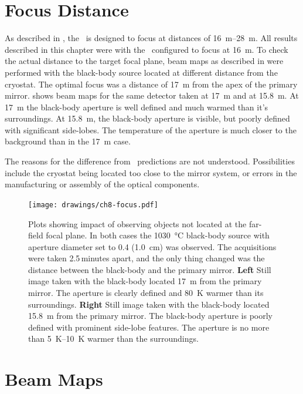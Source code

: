 \section{Focus Distance}\label{sec:ch8-focus-distance}

As described in , the \Imager\ is designed to focus at distances of \SIrange{16}{28}{\m}.
All results described in this chapter were with the \Imager\ configured to focus at 16~m.
To check the actual distance to the target focal plane, beam maps as described in  were performed with the black-body source located at different distance from the cryostat.
The optimal focus was a distance of \SI{17}{\m} from the apex of the primary mirror.
 shows beam maps for the same detector taken at \SI{17}{\m} and at \SI{15.8}{\m}.
At \SI{17}{\m} the black-body aperture is well defined and much warmed than it's surroundings.
At \SI{15.8}{\m}, the black-body aperture is visible, but poorly defined with significant side-lobes.
The temperature of the aperture is much closer to the background than in the \SI{17}{\m} case.

The reasons for the difference from \ZEMAX\ predictions are not understood.
Possibilities include the cryostat being located too close to the mirror system, or errors in the manufacturing or assembly of the optical components.

\begin{figure}[th]
\centering
\texttt{[image: drawings/ch8-focus.pdf]}
\caption{
  Plots showing impact of observing objects not located at the far-field focal plane.
  In both cases the \SI{1030}{\celsius} black-body source with aperture diameter set to \SI{0.4}{\in} (\SI{1.0}{\cm}) was observed. The acquisitions were taken 2.5\,minutes apart, and the only thing changed was the distance between the black-body and the primary mirror.
  \textbf{Left} Still image taken with the black-body located \SI{17}{\m} from the primary mirror.
  The aperture is clearly defined and \SI{80}{\K} warmer than its surroundings.
  \textbf{Right} Still image taken with the black-body located \SI{15.8}{\m} from the primary mirror.
  The black-body aperture is poorly defined with prominent side-lobe features.
  The aperture is no more than \SIrange{5}{10}{\K} warmer than the surroundings.
}
\label{fig:ch8-focus}
\end{figure}

\section{Beam Maps} \label{sec:ch8-beam-maps}

